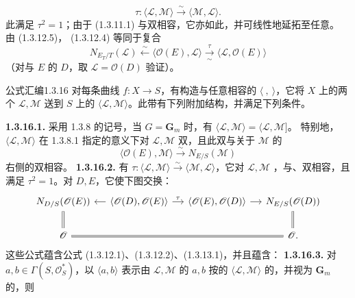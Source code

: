 \begin{equation}\tau:\langle\mathscr L,\mathscr M\rangle\xrightarrow\sim\langle\mathscr M,\mathscr L\rangle.\tag{1.3.15.1}\end{equation}
此满足 $\tau^2=1$；由于 (1.3.11.1) 与双相容，它亦如此，并可线性地延拓至任意。
由 (1.3.12.5)， (1.3.12.4) 等同于复合
\[N_{E_T/T}(\mathscr L)\xleftarrow\sim\langle\mathscr O(E),\mathscr L\rangle\xrightarrow[\sim]{\tau}\langle\mathscr L,\mathscr O(E)\rangle\]
（对与 $E$ 的 $D$，取 $\mathscr L=\mathscr O(D)$ 验证）。
\begin{SGAresult}{公式汇编}{1.3.16}
对每条曲线 $f:X\to S$，有构造与任意相容的 $\langle\ ,\ \rangle$，它将 $X$ 上的两个 $\mathscr L,\mathscr M$ 送到 $S$ 上的 $\langle\mathscr L,\mathscr M\rangle$。此带有下列附加结构，并满足下列条件。
\end{SGAresult}
\textbf{1.3.16.1.} 采用 1.3.8 的记号，当 $G=\mathbf G_m$ 时，有 $\langle\mathscr L,\mathscr M\rangle=\langle\mathscr L,\mathscr M]$。
特别地，$\langle\mathscr L,\mathscr M\rangle$ 在 1.3.8.1 指定的意义下对 $\mathscr L,\mathscr M$ 双，且此双与关于 $\mathscr M$ 的
\[\langle\mathscr O(E),\mathscr M\rangle\xrightarrow\sim N_{E/S}(\mathscr M)\]
右侧的双相容。
\textbf{1.3.16.2.} 有 $\tau:\langle\mathscr L,\mathscr M\rangle\xrightarrow\sim\langle\mathscr M,\mathscr L\rangle$，它对 $\mathscr L,\mathscr M$ ，与、双相容，且满足 $\tau^2=1$。对 $D,E$，它使下图交换：
\[\begin{tikzcd}[column sep=small]N_{D/S}(\mathscr O(E))\ar[d,equal]&\langle\mathscr O(D),\mathscr O(E)\rangle\ar[l]\ar[r,"\tau"]&\langle\mathscr O(E),\mathscr O(D)\rangle\ar[r]&N_{E/S}(\mathscr O(D))\ar[d,equal]\\\mathscr O\ar[rrr,equal]&&&\mathscr O.\end{tikzcd}\]
这些公式蕴含公式 (1.3.12.1)、(1.3.12.2)、(1.3.13.1)，并且蕴含：
\textbf{1.3.16.3.} 对 $a,b\in\Gamma(S,\mathscr O_S^*)$，以 $\langle a,b\rangle$ 表示由 $\mathscr L,\mathscr M$ 的 $a,b$ 按的 $\langle\mathscr L,\mathscr M\rangle$ 的，并视为 $\mathbf G_m$ 的，则
